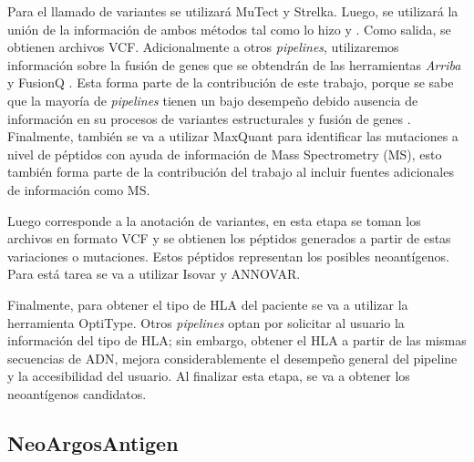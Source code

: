 \documentclass[a4paper,11pt]{article}
\begin{document}
Para el llamado de variantes se utilizará MuTect y Strelka. Luego, se utilizará la unión de la información de ambos métodos tal como lo hizo \cite{zhou2023prioritizing} y \cite{rubinsteyn2018computational}. Como salida, se obtienen archivos VCF. Adicionalmente a otros \textit{pipelines}, utilizaremos información sobre la fusión de genes que se obtendrán de las herramientas \textit{Arriba} \citep{uhrig2021accurate} y FusionQ \citep{liu2013fusionq}. Esta forma parte de la contribución de este trabajo, porque se sabe que la mayoría de \textit{pipelines} tienen un bajo desempeño debido ausencia de información en su procesos de variantes estructurales y fusión de genes \citep{wood2020neoepiscope}. Finalmente, también se va a utilizar MaxQuant para identificar las mutaciones a nivel de péptidos con ayuda de información de Mass Spectrometry (MS), esto también forma parte de la contribución del trabajo al incluir fuentes adicionales de información como MS.


Luego corresponde a la anotación de variantes, en esta etapa se toman los archivos en formato VCF y se obtienen los péptidos generados a partir de estas variaciones o mutaciones. Estos péptidos representan los posibles neoantígenos. Para está tarea se va a utilizar Isovar y ANNOVAR. 

Finalmente, para obtener el tipo de HLA del paciente se va a utilizar la herramienta OptiType. Otros \textit{pipelines} optan por solicitar al usuario la información del tipo de HLA; sin embargo, obtener el HLA a partir de las mismas secuencias de ADN, mejora considerablemente el desempeño general del pipeline y la accesibilidad del usuario. Al  finalizar esta etapa, se va a obtener los neoantígenos candidatos.


\subsection{NeoArgosAntigen}
\end{document}

